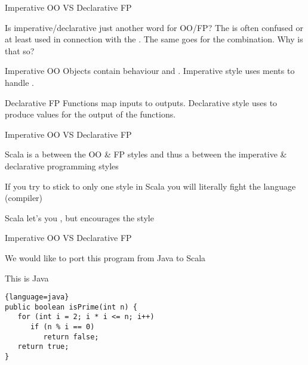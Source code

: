 \begin{frame}{Imperative OO VS Declarative FP}
\begin{block}{Is imperative/declarative just another word for OO/FP?}
The  is often confused or at least used in
connection with the . The same goes for the
 combination. Why is that so?
\end{block}
\pause
\begin{block}{Imperative OO}
Objects contain behaviour and . Imperative style uses
ments to handle .
\end{block}
\pause
\begin{block}{Declarative FP}
Functions map inputs to outputs. Declarative style uses 
to produce values for the output of the functions.
\end{block}
\end{frame}

\begin{frame}{Imperative OO VS Declarative FP}
\begin{center}
Scala is a  between the OO \& FP styles and thus a
 between the imperative \& declarative programming styles
\end{center}
\begin{center}
If you try to \alert{stick to only one style} in Scala you will literally
\alert{fight the language (compiler)}
\end{center}
\begin{center}
Scala let's you , but encourages the
 style
\end{center}
\end{frame}

\begin{frame}[fragile]{Imperative OO VS Declarative FP}
\begin{center}
We would like to port this program from Java to Scala
\end{center}
\begin{block}{This is Java}
\begin{lstlisting}{language=java}
public boolean isPrime(int n) {
   for (int i = 2; i * i <= n; i++)
      if (n % i == 0)
         return false;
   return true;
}
\end{lstlisting}
\end{block}
\end{frame}

